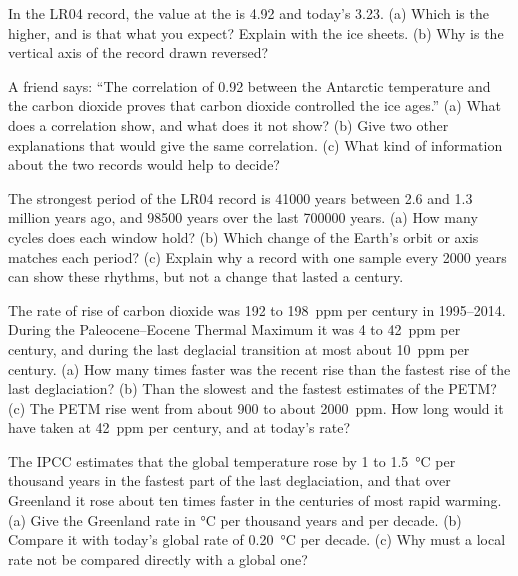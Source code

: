 \begin{exercise}[$\star\star$]\label{exo:g12:past-climates:10}
In the LR04 record, the value at the  is
\qty{4.92}{\permil} and today's \qty{3.23}{\permil}. (a) Which is the higher,
and is that what you expect? Explain with the ice sheets. (b) Why is the
vertical axis of the record drawn reversed?
\end{exercise}

\begin{exercise}[$\star\star$]\label{exo:g12:past-climates:11}
A friend says: ``The correlation of 0.92 between the Antarctic temperature
and the carbon dioxide proves that carbon dioxide controlled the ice ages.''
(a) What does a correlation show, and what does it not show? (b) Give two
other explanations that would give the same correlation. (c) What kind of
information about the two records would help to decide?
\end{exercise}

\begin{exercise}[$\star\star\star$]\label{exo:g12:past-climates:12}
The strongest period of the LR04 record is \num{41000} years between 2.6
and 1.3 million years ago, and \num{98500} years over the last \num{700000}
years. (a) How many cycles does each window hold? (b) Which change of the
Earth's orbit or axis matches each period? (c) Explain why a record with
one sample every \num{2000} years can show these rhythms, but not a change
that lasted a century.
\end{exercise}

\begin{exercise}[$\star\star\star$]\label{exo:g12:past-climates:13}
The rate of rise of carbon dioxide was 192 to \qty{198}{ppm} per century in
1995--2014. During the Paleocene--Eocene Thermal Maximum it was 4 to
\qty{42}{ppm} per century, and during the last deglacial transition at most
about \qty{10}{ppm} per century. (a) How many times faster was the recent rise
than the fastest rise of the last deglaciation? (b) Than the slowest and the
fastest estimates of the PETM? (c) The PETM rise went from about 900 to about
\qty{2000}{ppm}. How long would it have taken at \qty{42}{ppm} per century,
and at today's rate?
\end{exercise}

\begin{exercise}[$\star\star\star$]\label{exo:g12:past-climates:14}
The IPCC estimates that the global temperature rose by 1 to
\qty{1.5}{\degreeCelsius} per thousand years in the fastest part of the last
deglaciation, and that over Greenland it rose about ten times faster in the
centuries of most rapid warming. (a) Give the Greenland rate in
\unit{\degreeCelsius} per thousand years and per decade. (b) Compare it with
today's global rate of \qty{0.20}{\degreeCelsius} per decade. (c) Why must a
local rate not be compared directly with a global one?
\end{exercise}

